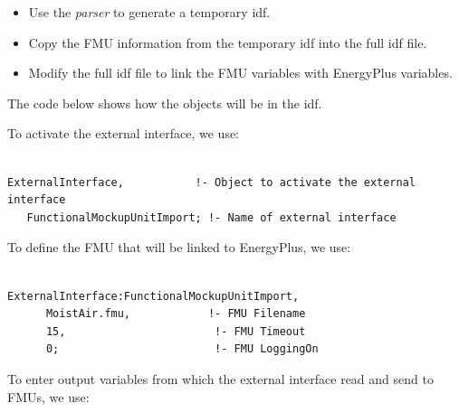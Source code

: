 \begin{itemize}
\item
  Use the \emph{parser} to generate a temporary idf.
\item
  Copy the FMU information from the temporary idf into the full idf file.
\item
  Modify the full idf file to link the FMU variables with EnergyPlus variables.
\end{itemize}

The code below shows how the objects will be in the idf.

To activate the external interface, we use:

\begin{lstlisting}

ExternalInterface,           !- Object to activate the external interface
   FunctionalMockupUnitImport; !- Name of external interface
\end{lstlisting}

To define the FMU that will be linked to EnergyPlus, we use:

\begin{lstlisting}

ExternalInterface:FunctionalMockupUnitImport,
      MoistAir.fmu,            !- FMU Filename
      15,                       !- FMU Timeout
      0;                        !- FMU LoggingOn
\end{lstlisting}

To enter output variables from which the external interface read and send to FMUs, we use:

